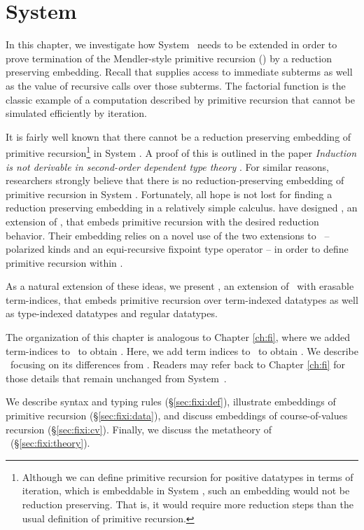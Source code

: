 \chapter{System \Fixi}\label{ch:fixi}
In this chapter, we investigate how System \Fw\ needs to be extended
in order to prove termination of the Mendler-style primitive recursion
(\MsfIt{}) by a reduction preserving embedding. Recall that \MsfIt{}
supplies access to immediate subterms as well as the value of recursive calls
over those subterms. The factorial function is the classic example of
a computation described by primitive recursion that cannot be simulated
efficiently by iteration.

It is fairly well known that there cannot be a reduction preserving embedding
of primitive recursion\footnote{
	Although we can define primitive recursion for positive datatypes
	in terms of iteration, which is embeddable in System \F, such an
	embedding would not be reduction preserving. That is, it would require
	more reduction steps than the usual definition of primitive recursion.}
in System \F. A proof of this is outlined in the paper 
\textit{Induction is not derivable in second-order dependent type theory}
\cite{Geuvers01}. For similar reasons, researchers strongly believe that
there is no reduction-preserving embedding of primitive recursion 
in System \Fw. Fortunately, all hope is not lost for finding
a reduction preserving embedding in a relatively simple calculus. 
\citet{AbeMat04} have designed \Fixw, an extension of \Fw,
that embeds primitive recursion with the desired reduction behavior.
Their embedding relies on a novel use of the two extensions to \Fw\ --
polarized kinds and an equi-recursive fixpoint type operator --
in order to define primitive recursion within \Fixw.

As a natural extension of these ideas, we present \Fixi,
an extension of \Fixw\ with erasable term-indices, that embeds
primitive recursion over term-indexed datatypes as well as
type-indexed datatypes and regular datatypes.

The organization of this chapter is analogous to Chapter \ref{ch:fi},
where we added term-indices to \Fw\ to obtain \Fi. Here, we add
term indices to \Fixw\ to obtain \Fixi. We describe \Fixi\ focusing on
its differences from \Fi. Readers may refer back to Chapter \ref{ch:fi}
for those details that remain unchanged from System~\Fi.

We describe syntax and typing rules (\S\ref{sec:fixi:def}),
illustrate embeddings of primitive recursion (\S\ref{sec:fixi:data}),
and discuss embeddings of course-of-values recursion (\S\ref{sec:fixi:cv}).
Finally, we discuss the metatheory of \Fixi\ (\S\ref{sec:fixi:theory}).





